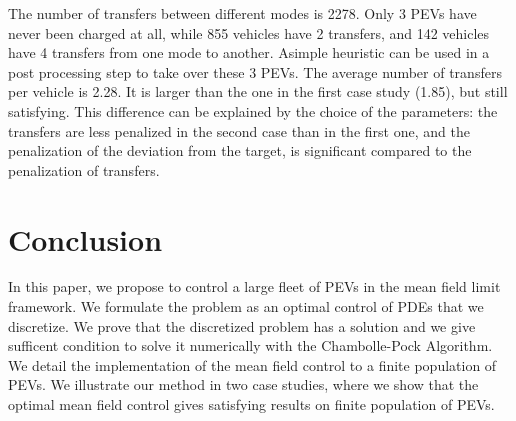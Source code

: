 \documentclass[conference]{IEEEtran}
\begin{document}
The number of transfers between different modes is 2278. Only 3 PEVs have never been charged at all, while 855 vehicles have 2 transfers, and 142 vehicles have 4 transfers from one mode to another. Asimple heuristic can be used in a post processing step to take over these 3 PEVs.
The average number of transfers per vehicle is 2.28. It is larger than the one in the first case study (1.85), but still satisfying. This difference can be explained by the choice of the parameters: the transfers are less penalized in the second case than in the first one, and the penalization of the deviation from the target, is significant compared to the penalization of transfers.
\section{Conclusion}
In this paper, we propose to control a large fleet of PEVs in the mean field limit framework. We formulate the problem as an optimal control of PDEs that we discretize. We prove that the discretized problem has a solution and we give sufficent condition to solve it numerically with the Chambolle-Pock Algorithm. We detail the implementation of the mean field control to a finite population of PEVs. We illustrate our method in two case studies, where we show that the optimal mean field control gives satisfying results on finite population of PEVs.
\end{document}
